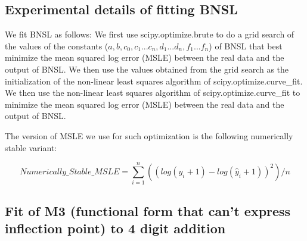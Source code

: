 \documentclass{article} %
\begin{document}
\subsection{Experimental details of fitting BNSL}
\label{section:BNSL_fit_details}
We fit BNSL as follows:
We first use scipy.optimize.brute to do a grid search of the values of the constants ($a, b, c_0, c_1 ... c_n, d_1 ...  d_n, f_1 ... f_n$) of BNSL that best minimize the mean squared log error (MSLE) between the real data and the output of BNSL.
We then use the values obtained from the grid search as the initialization of the non-linear least squares algorithm of scipy.optimize.curve\_fit.
We then use the non-linear least squares algorithm of scipy.optimize.curve\_fit to minimize the mean squared log error (MSLE) between the real data and the output of BNSL.

The version of MSLE we use for such optimization is the following numerically stable variant:

\[Numerically\_Stable\_MSLE = \sum_{i=1}^{n} ((log(y_{i}+1)-log(\hat{y}_{i}+1))^2)/n\] 

\iffalse

\subsection{Fit of M3 (functional form that can't express inflection point) to 4 digit addition}
\FloatBarrier
\label{section:M3_addition_failure}
\end{document}
